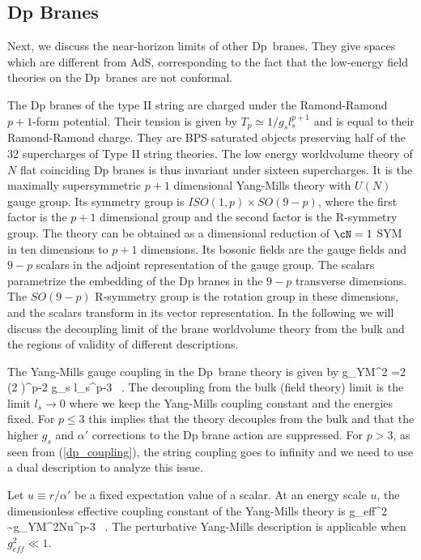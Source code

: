 \subsection{Dp Branes}
\label{dpbranes}

Next, we discuss the near-horizon limits of other Dp~branes. They give
spaces which are different from AdS, corresponding to the fact that
the low-energy field theories on the Dp~branes are not conformal.

The Dp branes of the type II string are charged under the
Ramond-Ramond $p+1$-form potential.  Their tension is given by $T_p
\simeq 1/g_sl_s^{p+1}$ and is equal to their Ramond-Ramond charge.
They are BPS saturated objects preserving half of the 32 supercharges
of Type II string theories.  The low energy worldvolume theory of $N$
flat coinciding Dp branes is thus invariant under sixteen
supercharges. It is the maximally supersymmetric $p+1$ dimensional
Yang-Mills theory with $U(N)$ gauge group.  Its symmetry group is
$ISO(1,p) \times SO(9-p)$, where the first factor is the $p+1$
dimensional \Poincare group and the second factor is the R-symmetry
group.  The theory can be obtained as a dimensional reduction of
$\cN=1$ SYM in ten dimensions to $p+1$ dimensions.  Its bosonic fields
are the gauge fields and $9-p$ scalars in the adjoint
representation of the gauge group.  The scalars parametrize the
embedding of the Dp branes in the $9-p$ transverse dimensions.  The
$SO(9-p)$ R-symmetry group is the rotation group in these dimensions,
and the scalars transform in its vector representation.  In the
following we will discuss the decoupling limit of the brane
worldvolume theory from the bulk and the regions of validity of
different descriptions.

The Yang-Mills gauge coupling in the Dp~brane theory is given 
by
\beq
g_{YM}^2 =2  (2 \pi)^{p-2} g_s l_s^{p-3} \ .
\label{dp_coupling}
\eeq
The decoupling from the bulk (field theory) limit is the limit $l_s
\rightarrow 0$ where we keep the Yang-Mills coupling constant and the
energies fixed.  For $p \leq 3$ this
implies that the theory decouples from the bulk and that the higher
$g_s$ and $\alpha'$ corrections to the Dp brane action are suppressed.
For $p > 3$, as seen from (\ref{dp_coupling}), the string coupling goes
to infinity and we need to use a dual description to analyze this
issue.

Let $u \equiv r/\alpha'$ be a fixed expectation value of a scalar. 
At an energy scale $u$, the dimensionless effective coupling constant
of the Yang-Mills theory is 
\beq
g_{eff}^2 \sim g_{YM}^2Nu^{p-3} \ .
\label{effective}
\eeq
The perturbative Yang-Mills description is applicable when $g_{eff}^2 \ll 1$.


